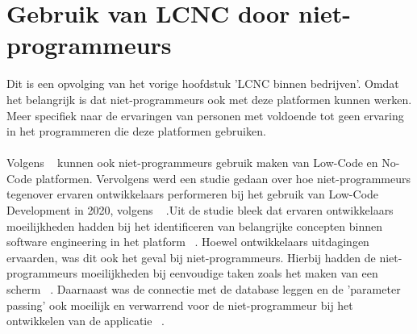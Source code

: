 \section{Gebruik van LCNC door niet-programmeurs}
\label{sec:lcnc-niet-programmeurs}
Dit is een opvolging van het vorige hoofdstuk 'LCNC binnen bedrijven'. Omdat het belangrijk is dat niet-programmeurs ook met deze platformen kunnen werken.
Meer specifiek naar de ervaringen van personen met voldoende tot geen ervaring in het programmeren die deze platformen gebruiken.
\\
\\
Volgens ~\textcite{Yan2021} kunnen ook niet-programmeurs gebruik maken van Low-Code en No-Code platformen.
Vervolgens werd een studie gedaan over hoe niet-programmeurs tegenover ervaren ontwikkelaars performeren bij het gebruik van Low-Code Development  in 2020, volgens ~\textcite{Hintsch2021} 
.Uit de studie bleek dat ervaren ontwikkelaars moeilijkheden hadden bij het identificeren van belangrijke concepten binnen software engineering in het platform ~\autocite{Hintsch2021}.
Hoewel ontwikkelaars uitdagingen ervaarden, was dit ook het geval bij niet-programmeurs. Hierbij hadden de niet-programmeurs moeilijkheden bij eenvoudige taken zoals het maken van een scherm  ~\autocite{Hintsch2021}.
Daarnaast was de connectie met de database leggen en de 'parameter passing' ook moeilijk en verwarrend voor de niet-programmeur bij het ontwikkelen van de applicatie  ~\autocite{Hintsch2021}.





